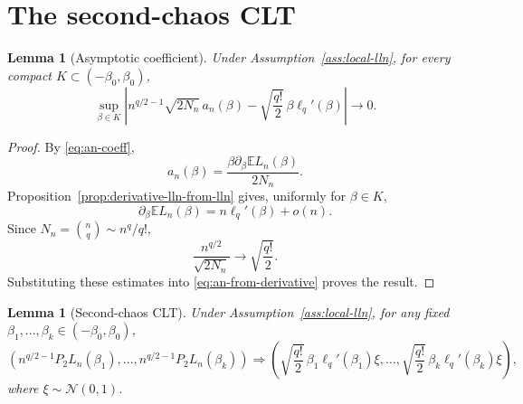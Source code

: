 \documentclass[11pt]{article}
\newtheorem{lemma}[theorem]{Lemma}
\newcommand{\E}{\mathbb{E}}
\newcommand{\N}{\mathcal{N}}
\begin{document}
\section{The second-chaos CLT}

\begin{lemma}[Asymptotic coefficient]\label{lem:coefficient-limit}
  Under Assumption~\ref{ass:local-lln}, for every compact
  $K\subset(-\beta_0,\beta_0)$,
  \begin{equation}\label{eq:coefficient-limit}
    \sup_{\beta\in K}
    \left|
      n^{q/2-1}\sqrt{2N_n}\,a_n(\beta)
      -
      \sqrt{\frac{q!}{2}}\,\beta\ell_q'(\beta)
    \right|
    \to0.
  \end{equation}
\end{lemma}

\begin{proof}
  By \eqref{eq:an-coeff},
  \begin{equation}\label{eq:an-from-derivative}
    a_n(\beta)=\frac{\beta\partial_\beta\E L_n(\beta)}{2N_n}.
  \end{equation}
  Proposition~\ref{prop:derivative-lln-from-lln} gives, uniformly for
  $\beta\in K$,
  \begin{equation}\label{eq:derivative-asymptotic}
    \partial_\beta\E L_n(\beta)=n\ell_q'(\beta)+o(n).
  \end{equation}
  Since $N_n=\binom{n}{q}\sim n^q/q!$,
  \begin{equation}\label{eq:Nn-asymptotic}
    \frac{n^{q/2}}{\sqrt{2N_n}}\to\sqrt{\frac{q!}{2}}.
  \end{equation}
  Substituting these estimates into \eqref{eq:an-from-derivative} proves the
  result.
\end{proof}

\begin{lemma}[Second-chaos CLT]\label{lem:p2-clt}
  Under Assumption~\ref{ass:local-lln}, for any fixed
  $\beta_1,\ldots,\beta_k\in(-\beta_0,\beta_0)$,
  \begin{equation}\label{eq:p2-clt}
    \left(
      n^{q/2-1}P_2L_n(\beta_1),\ldots,
      n^{q/2-1}P_2L_n(\beta_k)
    \right)
    \Rightarrow
    \left(
      \sqrt{\frac{q!}{2}}\,\beta_1\ell_q'(\beta_1)\xi,
      \ldots,
      \sqrt{\frac{q!}{2}}\,\beta_k\ell_q'(\beta_k)\xi
    \right),
  \end{equation}
  where $\xi\sim\N(0,1)$.
\end{lemma}
\end{document}
